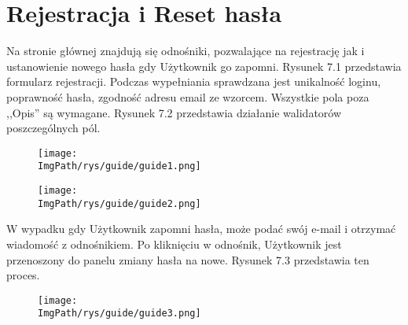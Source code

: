 \documentclass[a4paper,12pt,twoside,openany]{report}
\newcommand{\ImgPath}{.}
\begin{document}
\section{Rejestracja i Reset hasła}
Na stronie głównej znajdują się odnośniki, pozwalające na rejestrację jak i ustanowienie nowego hasła gdy Użytkownik go zapomni. Rysunek 7.1 przedstawia formularz rejestracji. Podczas wypełniania sprawdzana jest unikalność loginu, poprawność hasła, zgodność adresu email ze wzorcem. Wszystkie pola poza ,,Opis'' są wymagane. Rysunek 7.2 przedstawia działanie walidatorów poszczególnych pól.
				\begin{figure}[!htbp]
					\begin{center}
						\centering
						\texttt{[image: \\ImgPath/rys/guide/guide1.png]}
					\end{center}
					\caption{}
					\label{UMLTS}
				\end{figure}
								\begin{figure}[!htbp]
									\begin{center}
										\centering
										\texttt{[image: \\ImgPath/rys/guide/guide2.png]}
									\end{center}
									\caption{}
									\label{UMLTS}
								\end{figure}
W wypadku gdy Użytkownik zapomni hasła, może podać swój e-mail i otrzymać wiadomość z odnośnikiem. Po kliknięciu w odnośnik, Użytkownik jest przenoszony do panelu zmiany hasła na nowe. Rysunek 7.3 przedstawia ten proces.
								\begin{figure}[!htbp]
									\begin{center}
										\centering
										\texttt{[image: \\ImgPath/rys/guide/guide3.png]}
									\end{center}
									\caption{}
									\label{UMLTS}
								\end{figure}
\end{document}
